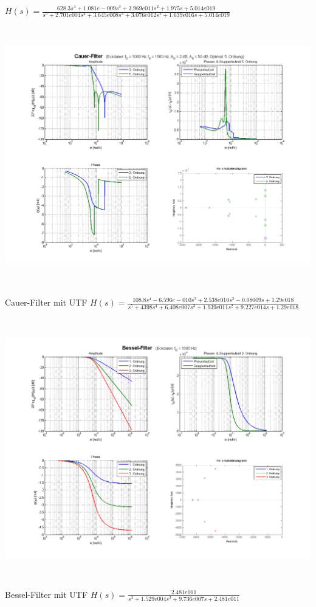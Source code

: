 \begin{center}
$H(s) = \frac{628.3 s^4 + 1.081e-009 s^3 + 3.969e011 s^2 + 1.975 s +
5.014e019}{s^5 + 2.701e004 s^4 + 3.645e008 s^3 + 3.076e012 s^2 + 1.639e016 s + 5.014e019}$
\includegraphics[height=12cm]{./images/filter-cauer.png} \\Cauer-Filter mit UTF
$H(s) = \frac{108.8 s^4 - 6.596e-010 s^3 + 2.538e010 s^2 - 0.08009 s + 1.29e018}{s^5 + 4398 s^4 + 6.408e007 s^3 + 1.939e011 s^2 + 9.227e014 s + 1.29e018}$
\includegraphics[height=12cm]{./images/filter-bessel.png} \\Bessel-Filter mit UTF $H(s) =
 \frac{2.481e011}{s^3 + 1.529e004 s^2 + 9.736e007 s + 2.481e011}$
\end{center}


